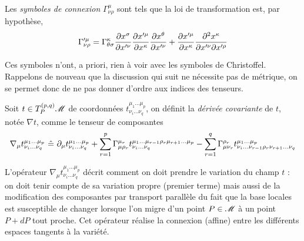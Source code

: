 \documentclass[a4paper,11pt]{report}
\begin{document}
                \begin{defn}
                    Les \textit{symboles de connexion} $\Gamma^\mu_{\nu\rho}$ sont tels que la loi de transformation est, par hypothèse,
                    \begin{equation}
                        \Gamma'^\mu_{\nu\rho} = \Gamma^\kappa_{\theta\sigma}\frac{\partial x^\sigma}{\partial x'^\nu} \frac{\partial x'^\mu}{\partial x^\kappa}\frac{\partial x^\theta}{\partial x'^\nu} +  \frac{\partial x'^\mu}{\partial x^\kappa}\frac{\partial^2 x^\kappa}{\partial x'^\nu\partial x'^\rho}
                    \end{equation}
                \end{defn}
                
                Ces symboles n'ont, a priori, rien à voir avec les symboles de Christoffel. Rappelons de nouveau que la discussion qui suit ne nécessite pas de métrique, on se permet donc de ne pas donner d'ordre aux indices des tenseurs.
                
                \begin{defn}
                    Soit $t\in T_P^{(p,q)}\mathscr{M}$ de coordonnées $t^{\mu_1\dots\mu_p}_{\nu_i\dots\nu_q}$, on définit la \textit{dérivée covariante} de $t$, notée $\nabla t$, comme le tenseur de composantes
                    \begin{equation}
                        \nabla_\mu t^{\mu_1\dots\mu_p}_{\nu_i\dots\nu_q} ~\hat{=}~ \partial_\mu t^{\mu_1\dots\mu_p}_{\nu_i\dots\nu_q}+\sum_{r=1}^p \Gamma^{\mu_r}_{\mu\rho_r}t^{\mu_1\dots\mu_{r-1}\rho_r\mu_{r+1}\dots\mu_p}_{\nu_i\dots\nu_q} - \sum_{r=1}^q \Gamma^{\rho_r}_{\mu\nu_r}t^{\mu_1\dots\mu_p}_{\nu_i\dots\nu_{r-1}\rho_r\nu_{r+1}\dots\nu_q}
                    \end{equation}
                \end{defn}
                
                L'opérateur $\nabla_\mu t^{\mu_1\dots\mu_p}_{\nu_i\dots\nu_q}$ décrit comment on doit prendre le variation du champ $t$ :  on doit tenir compte de sa variation propre (premier terme) mais aussi de la modification des composantes par transport parallèle du fait que la base locales est susceptible de changer lorsque l'on migre d'un point $P\in\mathscr{M}$ à un point $P+dP$ tout proche. Cet opérateur réalise la connexion (affine) entre les différents espaces tangents à la variété.
                
\end{document}
